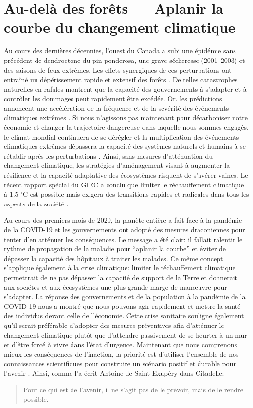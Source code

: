 \hypertarget{au-deluxe0-des-foruxeats-aplanir-la-courbe-du-changement-climatique}{%
\section{Au-delà des forêts --- Aplanir la courbe du changement
climatique}\label{au-deluxe0-des-foruxeats-aplanir-la-courbe-du-changement-climatique}}

Au cours des dernières décennies, l'ouest du Canada a subi une épidémie
sans précédent de dendroctone du pin ponderosa, une grave sécheresse
(2001--2003) et des saisons de feux extrêmes. Les effets synergiques de
ces perturbations ont entraîné un dépérissement rapide et extensif des
forêts \citep{williamson_climate_2009}. De telles catastrophes
naturelles en rafales montrent que la capacité des gouvernements à
s'adapter et à contrôler les dommages peut rapidement être excédée. Or,
les prédictions annoncent une accélération de la fréquence et de la
sévérité des événements climatiques extrêmes \citep{ipcc_climate_2014}.
Si nous n'agissons pas maintenant pour décarboniser notre économie et
changer la trajectoire dangereuse dans laquelle nous sommes engagés, le
climat mondial continuera de se dérégler et la multiplication des
événements climatiques extrêmes dépassera la capacité des systèmes
naturels et humains à se rétablir après les perturbations
\citep{ipcc_summary_2018}. Ainsi, sans mesures d'atténuation du
changement climatique, les stratégies d'aménagement visant à augmenter
la résilience et la capacité adaptative des écosystèmes risquent de
s'avérer vaines. Le récent rapport spécial du GIEC a conclu que limiter
le réchauffement climatique à 1.5 \(^{\circ}\)C est possible mais
exigera des transitions rapides et radicales dans tous les aspects de la
société \citep{ipcc_summary_2018}.

Au cours des premiers mois de 2020, la planète entière a fait face à la
pandémie de la COVID-19 et les gouvernements ont adopté des mesures
draconiennes pour tenter d'en atténuer les conséquences. Le message a
été clair: il fallait ralentir le rythme de propagation de la maladie
pour ``aplanir la courbe'' et éviter de dépasser la capacité des
hôpitaux à traiter les malades. Ce même concept s'applique également à
la crise climatique: limiter le réchauffement climatique permettrait de
ne pas dépasser la capacité de support de la Terre et donnerait aux
sociétés et aux écosystèmes une plus grande marge de man\oe{}uvre pour
s'adapter. La réponse des gouvernements et de la population à la
pandémie de la COVID-19 nous a montré que nous pouvons agir rapidement
et mettre la santé des individus devant celle de l'économie. Cette crise
sanitaire souligne également qu'il serait préférable d'adopter des
mesures préventives afin d'atténuer le changement climatique plutôt que
d'attendre passivement de se heurter à un mur et d'être forcé à vivre
dans l'état d'urgence. Maintenant que nous comprenons mieux les
conséquences de l'inaction, la priorité est d'utiliser l'ensemble de nos
connaissances scientifiques pour construire un scénario positif et
durable pour l'avenir \citep{bennett_bright_2016}. Ainsi, comme l'a
écrit Antoine de Saint-Exupéry
\citeyearpar{saint-exupery_citadelle_1948} dans Citadelle:

\begin{quote}
Pour ce qui est de l'avenir, il ne s'agit pas de le prévoir, mais de le
rendre possible.
\end{quote}
